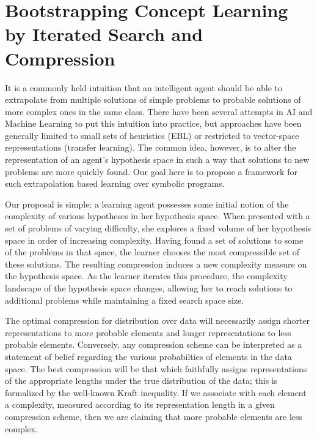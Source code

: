 \documentclass{article}
\begin{document}
\section{Bootstrapping Concept Learning by Iterated Search and Compression}

It is a commonly held intuition that an intelligent agent should be
able to extrapolate from multiple solutions of simple problems to
probable solutions of more complex ones in the same class. There have
been several attempts in AI and Machine Learning to put this intuition
into practice, but approaches have been generally limited to small
sets of heuristics (EBL) or restricted to vector-space representations
(transfer learning). The common idea, however, is to alter the
representation of an agent's hypothesis space in such a way that
solutions to new problems are more quickly found. Our goal here is to
propose a framework for such extrapolation based learning over
symbolic programs.

Our proposal is simple: a learning agent possesses some initial notion
of the complexity of various hypotheses in her hypothesis space.  When
presented with a set of problems of varying difficulty, she explores a
fixed volume of her hypothesis space in order of increasing
complexity. Having found a set of solutions to some of the problems in
that space, the learner chooses the most compressible set of these
solutions. The resulting compression induces a new complexity measure
on the hypothesis space. As the learner iterates this procedure, the
complexity landscape of the hypothesis space changes, allowing her to
reach solutions to additional problems while maintaining a fixed
search space size. 

The optimal compression for distribution over data will necessarily
assign shorter representations to more probable elements and longer
representations to less probable elements. Conversely, any compression
scheme can be interpreted as a statement of belief regarding the
various probabilties of elements in the data space. The best
compression will be that which faithfully assigns representations of
the appropriate lengths under the true distribution of the data; this
is formalized by the well-known Kraft inequality. If we associate with
each element a complexity, measured according to its representation
length in a given compression scheme, then we are claiming that more
probable elements are less complex.
\end{document}

